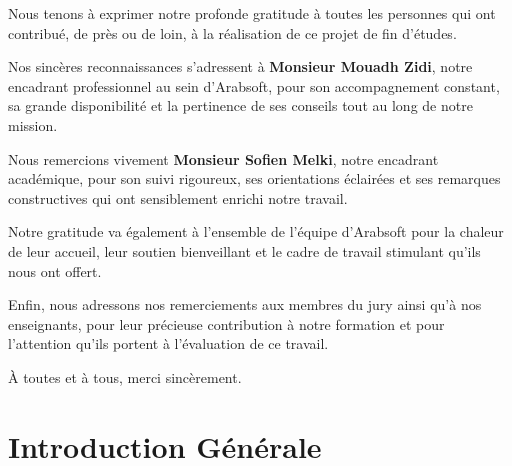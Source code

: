 \documentclass[12pt,a4paper,oneside]{report}
\begin{document}
\vspace*{1cm}
Nous tenons à exprimer notre profonde gratitude à toutes les personnes qui ont
contribué, de près ou de loin, à la réalisation de ce projet de fin d'études.

\medskip
Nos sincères reconnaissances s'adressent à \textbf{Monsieur Mouadh Zidi}, notre
encadrant professionnel au sein d'Arabsoft, pour son accompagnement constant, sa
grande disponibilité et la pertinence de ses conseils tout au long de notre mission.

\medskip
Nous remercions vivement \textbf{Monsieur Sofien Melki}, notre encadrant académique,
pour son suivi rigoureux, ses orientations éclairées et ses remarques constructives
qui ont sensiblement enrichi notre travail.

\medskip
Notre gratitude va également à l'ensemble de l'équipe d'Arabsoft pour la chaleur
de leur accueil, leur soutien bienveillant et le cadre de travail stimulant qu'ils
nous ont offert.

\medskip
Enfin, nous adressons nos remerciements aux membres du jury ainsi qu'à nos
enseignants, pour leur précieuse contribution à notre formation et pour l'attention
qu'ils portent à l'évaluation de ce travail.

\bigskip
\noindent À toutes et à tous, merci sincèrement.

\cleardoublepage

\tableofcontents
\cleardoublepage

\listoffigures
{}
\cleardoublepage

\listoftables
{}
\cleardoublepage


\cleardoublepage

\setcounter{page}{1}
\chapter*{Introduction Générale}
\end{document}
